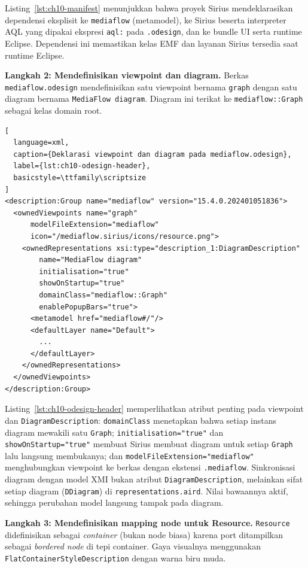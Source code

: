 \noindent Listing~\ref{lst:ch10-manifest} menunjukkan bahwa proyek Sirius mendeklarasikan dependensi eksplisit ke \texttt{mediaflow} (metamodel), ke Sirius beserta interpreter AQL yang dipakai ekspresi \texttt{aql:} pada \texttt{.odesign}, dan ke bundle UI serta runtime Eclipse. Dependensi ini memastikan kelas EMF dan layanan Sirius tersedia saat runtime Eclipse.

\textbf{Langkah 2: Mendefinisikan viewpoint dan diagram.} Berkas \texttt{mediaflow.odesign} mendefinisikan satu viewpoint bernama \texttt{graph} dengan satu diagram bernama \texttt{MediaFlow diagram}. Diagram ini terikat ke \texttt{mediaflow::Graph} sebagai kelas domain root.

\begin{lstlisting}[
  language=xml,
  caption={Deklarasi viewpoint dan diagram pada mediaflow.odesign},
  label={lst:ch10-odesign-header},
  basicstyle=\ttfamily\scriptsize
]
<description:Group name="mediaflow" version="15.4.0.202401051836">
  <ownedViewpoints name="graph"
      modelFileExtension="mediaflow"
      icon="/mediaflow.sirius/icons/resource.png">
    <ownedRepresentations xsi:type="description_1:DiagramDescription"
        name="MediaFlow diagram"
        initialisation="true"
        showOnStartup="true"
        domainClass="mediaflow::Graph"
        enablePopupBars="true">
      <metamodel href="mediaflow#/"/>
      <defaultLayer name="Default">
        ...
      </defaultLayer>
    </ownedRepresentations>
  </ownedViewpoints>
</description:Group>
\end{lstlisting}

\noindent Listing~\ref{lst:ch10-odesign-header} memperlihatkan atribut penting pada viewpoint dan \texttt{DiagramDescription}: \texttt{domainClass} menetapkan bahwa setiap instans diagram mewakili satu \texttt{Graph}; \texttt{initialisation="true"} dan \texttt{showOnStartup="true"} membuat Sirius membuat diagram untuk setiap \texttt{Graph} lalu langsung membukanya; dan \texttt{modelFileExtension="mediaflow"} menghubungkan viewpoint ke berkas dengan ekstensi \texttt{.mediaflow}. Sinkronisasi diagram dengan model XMI bukan atribut \texttt{DiagramDescription}, melainkan sifat setiap diagram (\texttt{DDiagram}) di \texttt{representations.aird}. Nilai bawaannya aktif, sehingga perubahan model langsung tampak pada diagram.

\textbf{Langkah 3: Mendefinisikan mapping node untuk Resource.} \texttt{Resource} didefinisikan sebagai \textit{container} (bukan node biasa) karena port ditampilkan sebagai \textit{bordered node} di tepi container. Gaya visualnya menggunakan \texttt{FlatContainerStyleDescription} dengan warna biru muda.

